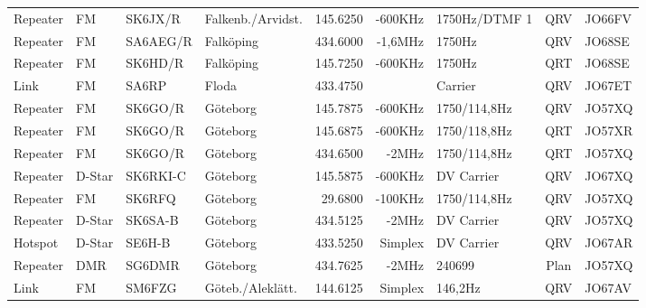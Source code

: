 \begin{landscape}
\begin{longtable}{llllrrlcl}
	Repeater          & FM           & SK6JX/R       & Falkenb./Arvidst.   &          145.6250 &        -600KHz & 1750Hz/DTMF 1   &       QRV       & JO66FV           \\
	Repeater          & FM           & SA6AEG/R      & Falköping           &          434.6000 &        -1,6MHz & 1750Hz          &       QRV       & JO68SE           \\
	Repeater          & FM           & SK6HD/R       & Falköping           &          145.7250 &        -600KHz & 1750Hz          &       QRT       & JO68SE           \\
	Link              & FM           & SA6RP         & Floda               &          433.4750 &                & Carrier         &       QRV       & JO67ET           \\
	Repeater          & FM           & SK6GO/R       & Göteborg            &          145.7875 &        -600KHz & 1750/114,8Hz    &       QRV       & JO57XQ           \\
	Repeater          & FM           & SK6GO/R       & Göteborg            &          145.6875 &        -600KHz & 1750/118,8Hz    &       QRT       & JO57XR           \\
	Repeater          & FM           & SK6GO/R       & Göteborg            &          434.6500 &          -2MHz & 1750/114,8Hz    &       QRT       & JO57XQ           \\
	Repeater          & D-Star       & SK6RKI-C      & Göteborg            &          145.5875 &        -600KHz & DV Carrier      &       QRV       & JO67XQ           \\
	Repeater          & FM           & SK6RFQ        & Göteborg            &           29.6800 &        -100KHz & 1750/114,8Hz    &       QRV       & JO57XQ           \\
	Repeater          & D-Star       & SK6SA-B       & Göteborg            &          434.5125 &          -2MHz & DV Carrier      &       QRV       & JO57XQ           \\
	Hotspot           & D-Star       & SE6H-B        & Göteborg            &          433.5250 &        Simplex & DV Carrier      &       QRV       & JO67AR           \\
	Repeater          & DMR          & SG6DMR        & Göteborg            &          434.7625 &          -2MHz & 240699          &      Plan       & JO57XQ           \\
	Link              & FM           & SM6FZG        & Göteb./Aleklätt.    &          144.6125 &        Simplex & 146,2Hz         &       QRV       & JO67AV           \\

\end{longtable}
\end{landscape}
